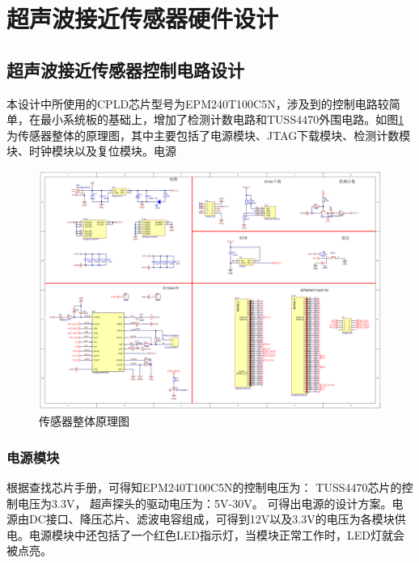     \newpage
	\section{超声波接近传感器硬件设计}
	
    \subsection{超声波接近传感器控制电路设计}
    本设计中所使用的CPLD芯片型号为EPM240T100C5N，涉及到的控制电路较简单，在最小系统板的基础上，增加了检测计数电路和TUSS4470外围电路。如图\ref{传感器整体原理图}为传感器整体的原理图，其中主要包括了电源模块、JTAG下载模块、检测计数模块、时钟模块以及复位模块。电源
    \begin{figure}[ht]
        \centering
        \includegraphics[width=12cm]{figure/Overall circuit.png}
        \caption{传感器整体原理图}
        \label{传感器整体原理图}
    \end{figure}
    \subsubsection{电源模块}
      根据查找芯片手册，可得知EPM240T100C5N的控制电压为：
    TUSS4470芯片的控制电压为3.3V，
    超声探头的驱动电压为：5V-30V。
    可得出电源的设计方案。电源由DC接口、降压芯片、滤波电容组成，可得到12V以及3.3V的电压为各模块供电。电源模块中还包括了一个红色LED指示灯，当模块正常工作时，LED灯就会被点亮。
    
